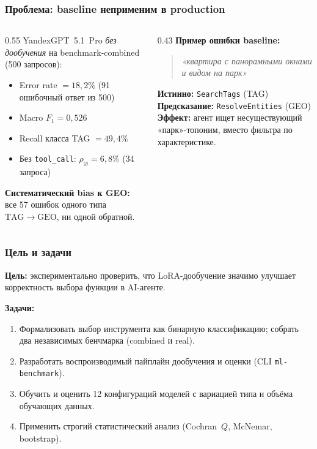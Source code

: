 \documentclass[aspectratio=169]{beamer}
\begin{document}
\begin{frame}
\frametitle{Проблема: baseline неприменим в production}
\begin{columns}[T]
\begin{column}{0.55\textwidth}
YandexGPT~5.1~Pro \emph{без дообучения} на benchmark-combined (500 запросов):
\begin{itemize}
  \item Error rate $= 18{,}2\%$ (91 ошибочный ответ из 500)
  \item Macro $F_1 = 0{,}526$
  \item Recall класса TAG $= 49{,}4\%$
  \item Без \texttt{tool\_call}: $\rho_\varnothing = 6{,}8\%$ (34 запроса)
\end{itemize}

\vspace{0.5em}
\textbf{Систематический bias к GEO:}\\
все 57 ошибок одного типа $\mathrm{TAG}\to\mathrm{GEO}$, ни одной обратной.
\end{column}
\begin{column}{0.43\textwidth}
\textbf{Пример ошибки baseline:}

\medskip
\begin{quote}
\itshape
«квартира с панорамными окнами и видом на парк»
\end{quote}

\smallskip
\textbf{Истинно:} \texttt{SearchTags} (TAG)\\
\textbf{Предсказание:} \texttt{ResolveEntities} (GEO)\\
\textbf{Эффект:} агент ищет несуществующий «парк»-топоним, вместо фильтра по характеристике.
\end{column}
\end{columns}
\end{frame}

\begin{frame}
\frametitle{Цель и задачи}
\textbf{Цель:} экспериментально проверить, что LoRA-дообучение значимо улучшает корректность выбора функции в AI-агенте.

\bigskip
\textbf{Задачи:}
\begin{enumerate}
  \item Формализовать выбор инструмента как бинарную классификацию; собрать два независимых бенчмарка (combined и real).
  \item Разработать воспроизводимый пайплайн дообучения и оценки (CLI \texttt{ml-benchmark}).
  \item Обучить и оценить 12 конфигураций моделей с вариацией типа и объёма обучающих данных.
  \item Применить строгий статистический анализ (Cochran~$Q$, McNemar, bootstrap).
\end{enumerate}
\end{frame}
\end{document}
